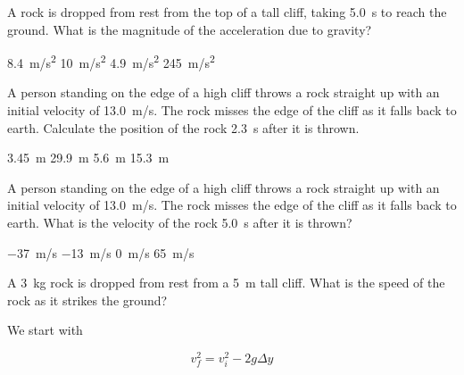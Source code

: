 \documentclass[../main-physics-problems.tex]{subfiles}
\begin{document}
\begin{questions}

\question
A rock is dropped from rest from the top of a tall cliff, taking \SI{5.0}{s} to reach the ground. What is the magnitude of the acceleration due to gravity?

\begin{choices}
    \choice \SI{8.4}{m/s^2}
    \correctchoice \SI{10}{m/s^2}
    \choice \SI{4.9}{m/s^2}
    \choice \SI{245}{m/s^2}
\end{choices}




\question \label{prob:cliff_rock2}
A person standing on the edge of a high cliff throws a rock straight up with an initial velocity of \SI{13.0}{m/s}. The rock misses the edge of the cliff as it falls back to earth. Calculate the position of the rock \SI{2.3}{s} after it is thrown.

\begin{choices}
    \correctchoice \SI{3.45}{m}
    \choice \SI{29.9}{m}
    \choice \SI{5.6}{m}
    \choice \SI{15.3}{m}
\end{choices}

\question \label{prob:cliff_rock3}
A person standing on the edge of a high cliff throws a rock straight up with an initial velocity of \SI{13.0}{m/s}. The rock misses the edge of the cliff as it falls back to earth. What is the velocity of the rock \SI{5.0}{s} after it is thrown?

\begin{choices}
    \correctchoice \SI{-37}{m/s}
    \choice \SI{-13}{m/s}
    \choice \SI{0}{m/s}
    \choice \SI{65}{m/s}
\end{choices}


\question
A \SI{3}{kg} rock is dropped from rest from a \SI{5}{m} tall cliff. What is the speed of the rock as it strikes the ground?

\begin{solution}
We start with 

\begin{equation*}
    v_f^2 = v_i^2 - 2g \Delta y
\end{equation*}


\end{solution}
\end{questions}
\end{document}
